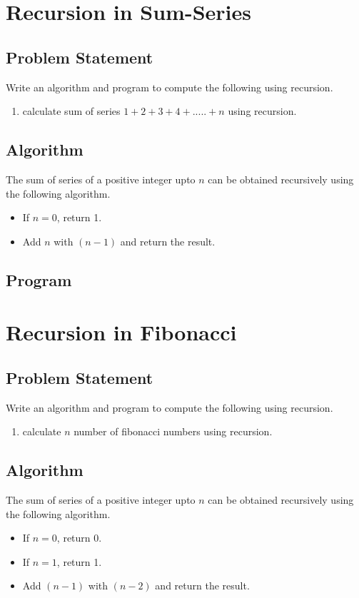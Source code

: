 \documentclass[11pt]{report}
\begin{document}
\chapter{Recursion in Sum-Series}
\section{Problem Statement}
Write an algorithm and program to compute the following using recursion.
\begin{enumerate}
  \item calculate sum of series $1+2+3+4+.....+n$ using recursion.
\end{enumerate}
\section{Algorithm}
The sum of series of a positive integer upto $n$ can be obtained recursively using the following algorithm.
\begin{itemize}
\item If $n=0$, return 1.
\item Add $n$ with $(n-1)$ and return the result. 
\end{itemize}

\section{Program}
        

\chapter{Recursion in Fibonacci}
\section{Problem Statement}
Write an algorithm and program to compute the following using recursion.
\begin{enumerate}
  \item calculate $n$ number of fibonacci numbers using recursion.
\end{enumerate}
\section{Algorithm}
The sum of series of a positive integer upto $n$ can be obtained recursively using the following algorithm.
\begin{itemize}
\item If $n=0$, return 0.
\item If $n=1$, return 1.
\item Add $(n-1)$ with $(n-2)$ and return the result. 
\end{itemize}
\end{document}

